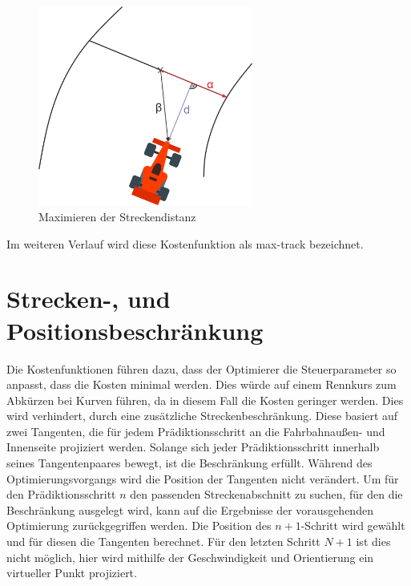 \documentclass{like}
\begin{document}
\begin{figure}[ht!]
	\centering
	\includegraphics[width=200pt]{Abbildungen/vektorRejection.png}
	\caption{Maximieren der Streckendistanz}
	\label{fig:maxDist}
\end{figure}
Im weiteren Verlauf wird diese Kostenfunktion als max-track bezeichnet.

\section{Strecken-, und Positionsbeschränkung}
\label{trackAndPosConstraint}
Die Kostenfunktionen führen dazu, dass der Optimierer die Steuerparameter so anpasst, dass die Kosten minimal werden. Dies würde auf einem Rennkurs zum Abkürzen bei Kurven führen, da in diesem Fall die Kosten geringer werden. Dies wird verhindert, durch eine zusätzliche Streckenbeschränkung. Diese basiert auf zwei Tangenten, die für jedem Prädiktionsschritt an die Fahrbahnaußen- und Innenseite projiziert werden. Solange sich jeder Prädiktionsschritt innerhalb seines Tangentenpaares bewegt, ist die Beschränkung erfüllt. Während des Optimierungsvorgangs wird die Position der Tangenten nicht verändert. Um für den Prädiktionsschritt \(n\) den passenden Streckenabschnitt zu suchen, für den die Beschränkung ausgelegt wird, kann auf die Ergebnisse der vorausgehenden Optimierung zurückgegriffen werden. Die Position des $n+1$-Schritt wird gewählt und für diesen die Tangenten berechnet. Für den letzten Schritt \(N +1\) ist dies nicht möglich, hier wird mithilfe der Geschwindigkeit und Orientierung ein virtueller Punkt projiziert.   
\end{document}
